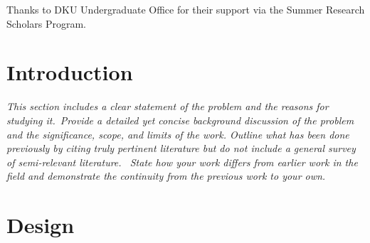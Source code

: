 \documentclass[11pt,a4paper,oneside]{report}
\newcommand{\instructions}[1]{{\color{orange}\itshape #1}}
\begin{document}
Thanks to DKU Undergraduate Office for their support via
the Summer Research Scholars Program.

\newpage


\setcounter{tocdepth}{1}
\listoffigures\newpage


\setcounter{tocdepth}{1}
\listoftables\newpage


\clearpage
{}


\chapter{Introduction}
\label{introduction}

\instructions{This section includes a clear statement of the problem and the
reasons for studying it.~Provide a detailed yet concise background
discussion of the problem and the significance, scope, and limits of the
work. Outline what has been done previously by citing truly pertinent
literature but do not include a general survey of semi-relevant
literature.~ State how your work differs from earlier work in the field
and demonstrate the continuity from the previous work to your own.}




\chapter{Design}
\label{design}
\end{document}
